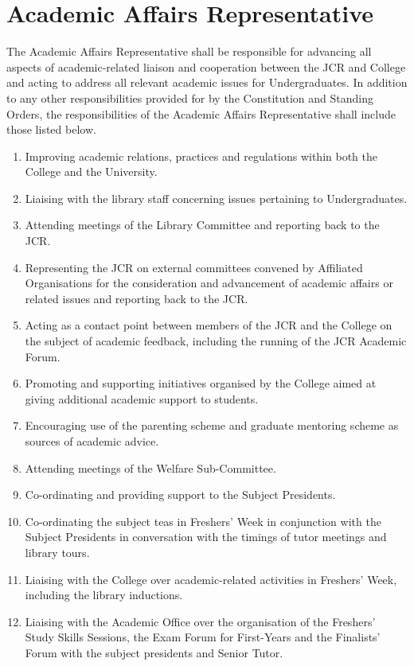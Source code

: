 \section{Academic Affairs Representative}
\npara The Academic Affairs Representative shall be responsible for advancing all aspects of academic-related liaison and cooperation between the JCR and College and acting to address all relevant academic issues for Undergraduates.  
\npara In addition to any other responsibilities provided for by the Constitution and Standing Orders, the responsibilities of the Academic Affairs Representative shall include those listed below.
\begin{enumerate}
	\item Improving academic relations, practices and regulations within both the College and the University.     
	\item Liaising with the library staff concerning issues pertaining to Undergraduates.
	\item Attending meetings of the Library Committee and reporting back to the JCR.
	\item Representing the JCR on external committees convened by Affiliated Organisations for the consideration and advancement of academic affairs or related issues and reporting back to the JCR.     
	\item Acting as a contact point between members of the JCR and the College on the subject of academic feedback, including the running of the JCR Academic Forum.
	\item Promoting and supporting initiatives organised by the College aimed at giving additional academic support to students.     
	\item Encouraging use of the parenting scheme and graduate mentoring scheme as sources of academic advice.     
	\item Attending meetings of the Welfare Sub-Committee.     
	\item Co-ordinating and providing support to the Subject Presidents.     
	\item Co-ordinating the subject teas in Freshers' Week in conjunction with the Subject Presidents in conversation with the timings of tutor meetings and library tours.
	\item Liaising with the College over academic-related activities in Freshers' Week, including the library inductions.
	\item Liaising with the Academic Office over the organisation of the Freshers' Study Skills Sessions, the Exam Forum for First-Years and the Finalists' Forum with the subject presidents and Senior Tutor.

\end{enumerate}
